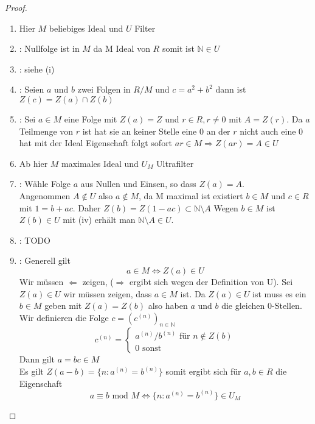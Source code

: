 \documentclass[a4paper]{article}
\begin{document}
\begin{proof} $ \text{ } $
\begin{enumerate}
     \item[ ] Hier $ M $ beliebiges Ideal und $ U $ Filter 
     \item: Nullfolge ist in $ M $ da M Ideal von $ R $ somit ist $ \mathbb{N} \in U $ 
     \item: siehe (i)  
     \item: Seien $ a $ und $ b $ zwei Folgen in $ R/M $ und $ c = a^2 + b^2 $   
            dann ist $ Z(c) = Z(a) \cap Z(b) $
     \item: Sei $ a \in M $ eine Folge mit $ Z(a) = Z $ und $ r \in R, r \neq 0 $ mit $ A = Z(r) $. 
            Da $ a $ Teilmenge von $ r $ ist hat sie an keiner Stelle eine $ 0 $ an der $ r $ nicht auch eine $ 0 $ hat 
            mit der Ideal Eigenschaft folgt sofort $ ar \in M \Rightarrow Z(ar) = A \in U $  
            \bigskip
     \item[ ] Ab hier $ M $ maximales Ideal und $ U_M $ Ultrafilter
     \item: Wähle Folge $ a $ aus Nullen und Einsen, so dass $ Z(a) = A $. \\ 
            Angenommen $ A \notin U $ also $ a \notin M $, da M maximal ist existiert $ b \in M $ und $ c \in R $ mit 
            $ 1 = b + ac $. Daher $ Z(b) = Z(1 - ac) \subset \mathbb{N} \setminus A $  
            Wegen $ b \in M $ ist $ Z(b) \in U $ mit (iv) erhält man $ \mathbb{N} \setminus A \in U $.
            \bigskip
     \item:     TODO
     \item: Generell gilt  $$ a \in M \iff Z(a) \in U $$ 
            Wir müssen $ \Leftarrow $ zeigen, ($ \Rightarrow $ ergibt sich wegen der Definition von U).
            Sei $ Z(a) \in U $ wir müssen zeigen, dass $ a \in M $ ist.
            Da $ Z(a) \in U $ ist muss es ein $ b \in M $ geben mit $ Z(a) = Z(b) $ also haben $ a $ und $ b $ 
            die gleichen 0-Stellen. Wir definieren die Folge $ c = (c^{(n)})_{n\in \mathbb{N}} $
            $$ 
            c^{(n)} = 
                  \begin{cases}
                     a^{(n)} / b^{(n)} \text{ für } n \notin Z(b) \\
                     0  \text{ sonst}   
                  \end{cases}
            $$
            Dann gilt $ a = bc \in M $ \\
            Es gilt $ Z(a -b) = \{n: a^{(n)} = b^{(n)}\} $ somit ergibt sich für $ a,b \in R $ die Eigenschaft
            $$ a \equiv b \text{ mod } M \iff \{n: a^{(n)} = b^{(n)}\} \in U_M $$


\end{enumerate}
\end{proof}
\end{document}
